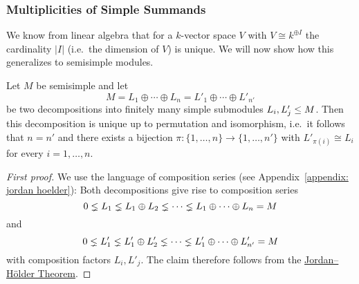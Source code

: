 \subsubsection{Multiplicities of Simple Summands}


\begin{fluff}
  We know from linear algebra that for a $k$-vector space $V$ with $V \cong k^{\oplus I}$ the cardinality $|I|$ (i.e.\ the dimension of $V$) is unique.
  We will now show how this generalizes to semisimple modules.
\end{fluff}


\begin{lemma}
  \label{lemma: multiplicities for finite length}
  Let $M$ be semisimple and let
  \[
      M
    = L_1 \oplus \dotsb \oplus L_n
    = L'_1 \oplus \dotsb \oplus L'_{n'}
  \]
  be two decompositions into finitely many simple submodules $L_i, L'_j \leq M$.
  Then this decomposition is unique up to permutation and isomorphism, i.e.\ it follows that $n = n'$ and there exists a bijection $\pi \colon \{1, \dotsc, n\} \to \{1, \dotsc, n'\}$ with $L'_{\pi(i)} \cong L_i$ for every $i = 1, \dotsc, n$.
\end{lemma}


\begin{proof}[First proof]
  We use the language of composition series (see Appendix~\ref{appendix: jordan hoelder}):
  Both decompositions give rise to composition series
  \[
                0
    \lneq  L_1
    \lneq  L_1 \oplus L_2
    \lneq  \dotsb
    \lneq  L_1 \oplus \dotsb \oplus L_n
    =           M
  \]
  and
  \[
                0
    \lneq  L'_1
    \lneq  L'_1 \oplus L'_2
    \lneq  \dotsb
    \lneq  L'_1 \oplus \dotsb \oplus L'_{n'}
    =           M
  \]
  with composition factors $L_i, L'_j$.
  The claim therefore follows from the \hyperref[theorem: jordan hoelder theorem]{Jordan--Hölder Theorem}.
\end{proof}


